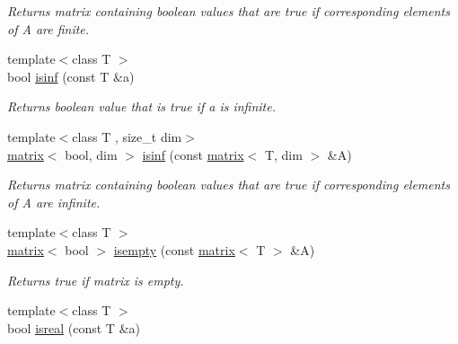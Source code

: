 \begin{DoxyCompactItemize}
\begin{DoxyCompactList}\small\item\em Returns matrix containing boolean values that are true if corresponding elements of A are finite. \end{DoxyCompactList}\item 
\hypertarget{namespacekeycpp_a852be6145adcca15ceaeb5a138651e20}{{\footnotesize template$<$class T $>$ }\\bool \hyperlink{namespacekeycpp_a852be6145adcca15ceaeb5a138651e20}{isinf} (const T \&a)}\label{namespacekeycpp_a852be6145adcca15ceaeb5a138651e20}

\begin{DoxyCompactList}\small\item\em Returns boolean value that is true if a is infinite. \end{DoxyCompactList}\item 
\hypertarget{namespacekeycpp_a606c5ce0dc3b7ec19ec18f3bbc21d4f2}{{\footnotesize template$<$class T , size\-\_\-t dim$>$ }\\\hyperlink{classkeycpp_1_1matrix}{matrix}$<$ bool, dim $>$ \hyperlink{namespacekeycpp_a606c5ce0dc3b7ec19ec18f3bbc21d4f2}{isinf} (const \hyperlink{classkeycpp_1_1matrix}{matrix}$<$ T, dim $>$ \&A)}\label{namespacekeycpp_a606c5ce0dc3b7ec19ec18f3bbc21d4f2}

\begin{DoxyCompactList}\small\item\em Returns matrix containing boolean values that are true if corresponding elements of A are infinite. \end{DoxyCompactList}\item 
\hypertarget{namespacekeycpp_acc2de8926c54a2048a0d8965e7d70995}{{\footnotesize template$<$class T $>$ }\\\hyperlink{classkeycpp_1_1matrix}{matrix}$<$ bool $>$ \hyperlink{namespacekeycpp_acc2de8926c54a2048a0d8965e7d70995}{isempty} (const \hyperlink{classkeycpp_1_1matrix}{matrix}$<$ T $>$ \&A)}\label{namespacekeycpp_acc2de8926c54a2048a0d8965e7d70995}

\begin{DoxyCompactList}\small\item\em Returns true if matrix is empty. \end{DoxyCompactList}\item 
\hypertarget{namespacekeycpp_a81a8c955cdbeb60181f6bf7d6553ac53}{{\footnotesize template$<$class T $>$ }\\bool \hyperlink{namespacekeycpp_a81a8c955cdbeb60181f6bf7d6553ac53}{isreal} (const T \&a)}\label{namespacekeycpp_a81a8c955cdbeb60181f6bf7d6553ac53}


\end{DoxyCompactItemize}
